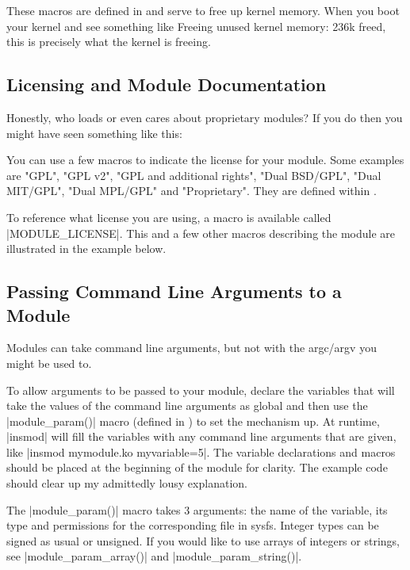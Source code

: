 \documentclass[10pt, oneside]{book}
\begin{document}
These macros are defined in  and serve to free up kernel memory.
When you boot your kernel and see something like Freeing unused kernel memory: 236k freed, this is precisely what the kernel is freeing.


\subsection{Licensing and Module Documentation}
\label{sec:modlicense}
Honestly, who loads or even cares about proprietary modules?
If you do then you might have seen something like this:

You can use a few macros to indicate the license for your module.
Some examples are "GPL", "GPL v2", "GPL and additional rights", "Dual BSD/GPL", "Dual MIT/GPL", "Dual MPL/GPL" and "Proprietary".
They are defined within .

To reference what license you are using, a macro is available called \cpp|MODULE_LICENSE|.
This and a few other macros describing the module are illustrated in the example below.


\subsection{Passing Command Line Arguments to a Module}
\label{sec:modparam}
Modules can take command line arguments, but not with the argc/argv you might be used to.

To allow arguments to be passed to your module, declare the variables that will take the values of the command line arguments as global and then use the \cpp|module_param()| macro (defined in ) to set the mechanism up.
At runtime, \sh|insmod| will fill the variables with any command line arguments that are given, like \sh|insmod mymodule.ko myvariable=5|.
The variable declarations and macros should be placed at the beginning of the module for clarity.
The example code should clear up my admittedly lousy explanation.

The \cpp|module_param()| macro takes 3 arguments: the name of the variable, its type and permissions for the corresponding file in sysfs.
Integer types can be signed as usual or unsigned. If you would like to use arrays of integers or strings,
see \cpp|module_param_array()| and \cpp|module_param_string()|.
\end{document}
